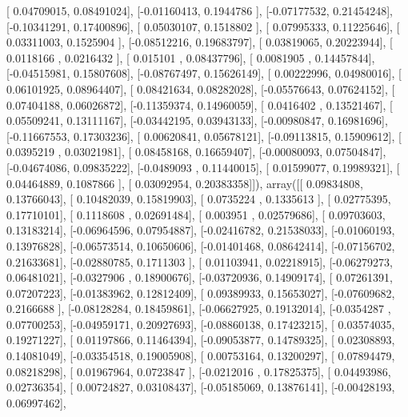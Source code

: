 \documentclass{article}
\begin{document}
       [ 0.04709015,  0.08491024],
       [-0.01160413,  0.1944786 ],
       [-0.07177532,  0.21454248],
       [-0.10341291,  0.17400896],
       [ 0.05030107,  0.1518802 ],
       [ 0.07995333,  0.11225646],
       [ 0.03311003,  0.1525904 ],
       [-0.08512216,  0.19683797],
       [ 0.03819065,  0.20223944],
       [ 0.0118166 ,  0.0216432 ],
       [ 0.015101  ,  0.08437796],
       [ 0.0081905 ,  0.14457844],
       [-0.04515981,  0.15807608],
       [-0.08767497,  0.15626149],
       [ 0.00222996,  0.04980016],
       [ 0.06101925,  0.08964407],
       [ 0.08421634,  0.08282028],
       [-0.05576643,  0.07624152],
       [ 0.07404188,  0.06026872],
       [-0.11359374,  0.14960059],
       [ 0.0416402 ,  0.13521467],
       [ 0.05509241,  0.13111167],
       [-0.03442195,  0.03943133],
       [-0.00980847,  0.16981696],
       [-0.11667553,  0.17303236],
       [ 0.00620841,  0.05678121],
       [-0.09113815,  0.15909612],
       [ 0.0395219 ,  0.03021981],
       [ 0.08458168,  0.16659407],
       [-0.00080093,  0.07504847],
       [-0.04674086,  0.09835222],
       [-0.0489093 ,  0.11440015],
       [ 0.01599077,  0.19989321],
       [ 0.04464889,  0.1087866 ],
       [ 0.03092954,  0.20383358]]), array([[ 0.09834808,  0.13766043],
       [ 0.10482039,  0.15819903],
       [ 0.0735224 ,  0.1335613 ],
       [ 0.02775395,  0.17710101],
       [ 0.1118608 ,  0.02691484],
       [ 0.003951  ,  0.02579686],
       [ 0.09703603,  0.13183214],
       [-0.06964596,  0.07954887],
       [-0.02416782,  0.21538033],
       [-0.01060193,  0.13976828],
       [-0.06573514,  0.10650606],
       [-0.01401468,  0.08642414],
       [-0.07156702,  0.21633681],
       [-0.02880785,  0.1711303 ],
       [ 0.01103941,  0.02218915],
       [-0.06279273,  0.06481021],
       [-0.0327906 ,  0.18900676],
       [-0.03720936,  0.14909174],
       [ 0.07261391,  0.07207223],
       [-0.01383962,  0.12812409],
       [ 0.09389933,  0.15653027],
       [-0.07609682,  0.2166688 ],
       [-0.08128284,  0.18459861],
       [-0.06627925,  0.19132014],
       [-0.0354287 ,  0.07700253],
       [-0.04959171,  0.20927693],
       [-0.08860138,  0.17423215],
       [ 0.03574035,  0.19271227],
       [ 0.01197866,  0.11464394],
       [-0.09053877,  0.14789325],
       [ 0.02308893,  0.14081049],
       [-0.03354518,  0.19005908],
       [ 0.00753164,  0.13200297],
       [ 0.07894479,  0.08218298],
       [ 0.01967964,  0.0723847 ],
       [-0.0212016 ,  0.17825375],
       [ 0.04493986,  0.02736354],
       [ 0.00724827,  0.03108437],
       [-0.05185069,  0.13876141],
       [-0.00428193,  0.06997462],
\end{document}

